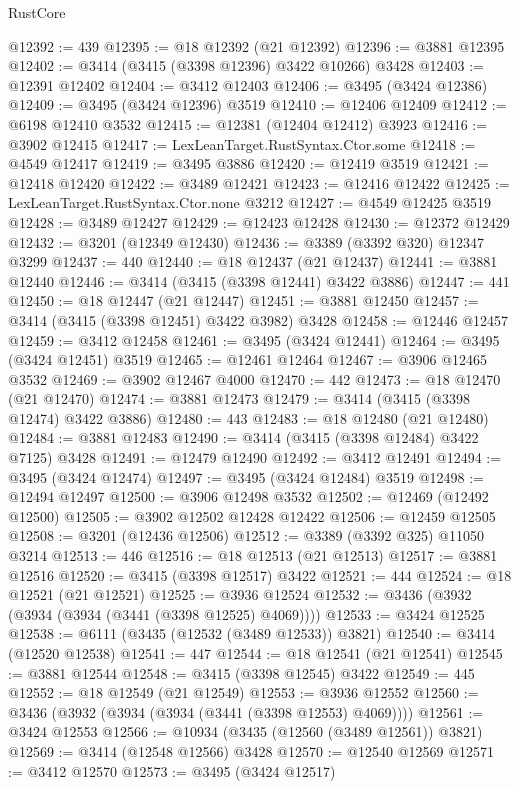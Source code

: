 \begin{lexlean}{RustCore}
\begin{coremodule}
@12392 := 439
@12395 := @18 @12392 (@21 @12392)
@12396 := @3881 @12395
@12402 := @3414 (@3415 (@3398 @12396) @3422 @10266) @3428
@12403 := @12391 @12402
@12404 := @3412 @12403
@12406 := @3495 (@3424 @12386)
@12409 := @3495 (@3424 @12396) @3519
@12410 := @12406 @12409
@12412 := @6198 @12410 @3532
@12415 := @12381 (@12404 @12412) @3923
@12416 := @3902 @12415
@12417 := LexLeanTarget.RustSyntax.Ctor.some
@12418 := @4549 @12417
@12419 := @3495 @3886
@12420 := @12419 @3519
@12421 := @12418 @12420
@12422 := @3489 @12421
@12423 := @12416 @12422
@12425 := LexLeanTarget.RustSyntax.Ctor.none @3212
@12427 := @4549 @12425 @3519
@12428 := @3489 @12427
@12429 := @12423 @12428
@12430 := @12372 @12429
@12432 := @3201 (@12349 @12430)
@12436 := @3389 (@3392 @320) @12347 @3299
@12437 := 440
@12440 := @18 @12437 (@21 @12437)
@12441 := @3881 @12440
@12446 := @3414 (@3415 (@3398 @12441) @3422 @3886)
@12447 := 441
@12450 := @18 @12447 (@21 @12447)
@12451 := @3881 @12450
@12457 := @3414 (@3415 (@3398 @12451) @3422 @3982) @3428
@12458 := @12446 @12457
@12459 := @3412 @12458
@12461 := @3495 (@3424 @12441)
@12464 := @3495 (@3424 @12451) @3519
@12465 := @12461 @12464
@12467 := @3906 @12465 @3532
@12469 := @3902 @12467 @4000
@12470 := 442
@12473 := @18 @12470 (@21 @12470)
@12474 := @3881 @12473
@12479 := @3414 (@3415 (@3398 @12474) @3422 @3886)
@12480 := 443
@12483 := @18 @12480 (@21 @12480)
@12484 := @3881 @12483
@12490 := @3414 (@3415 (@3398 @12484) @3422 @7125) @3428
@12491 := @12479 @12490
@12492 := @3412 @12491
@12494 := @3495 (@3424 @12474)
@12497 := @3495 (@3424 @12484) @3519
@12498 := @12494 @12497
@12500 := @3906 @12498 @3532
@12502 := @12469 (@12492 @12500)
@12505 := @3902 @12502 @12428 @12422
@12506 := @12459 @12505
@12508 := @3201 (@12436 @12506)
@12512 := @3389 (@3392 @325) @11050 @3214
@12513 := 446
@12516 := @18 @12513 (@21 @12513)
@12517 := @3881 @12516
@12520 := @3415 (@3398 @12517) @3422
@12521 := 444
@12524 := @18 @12521 (@21 @12521)
@12525 := @3936 @12524
@12532 := @3436 (@3932 (@3934 (@3934 (@3441 (@3398 @12525) @4069))))
@12533 := @3424 @12525
@12538 := @6111 (@3435 (@12532 (@3489 @12533)) @3821)
@12540 := @3414 (@12520 @12538)
@12541 := 447
@12544 := @18 @12541 (@21 @12541)
@12545 := @3881 @12544
@12548 := @3415 (@3398 @12545) @3422
@12549 := 445
@12552 := @18 @12549 (@21 @12549)
@12553 := @3936 @12552
@12560 := @3436 (@3932 (@3934 (@3934 (@3441 (@3398 @12553) @4069))))
@12561 := @3424 @12553
@12566 := @10934 (@3435 (@12560 (@3489 @12561)) @3821)
@12569 := @3414 (@12548 @12566) @3428
@12570 := @12540 @12569
@12571 := @3412 @12570
@12573 := @3495 (@3424 @12517)

\end{coremodule}
\end{lexlean}
